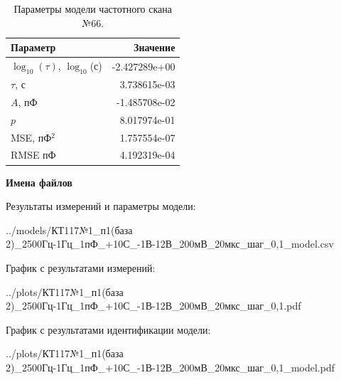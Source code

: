 \begin{table}[!ht]
    \centering
    \caption{Параметры модели частотного скана №66.}
    \begin{tabular}{|l|r|}
        \hline
        Параметр                                       & Значение                  \\ \hline
        $\log_{10}(\tau)$, $\log_{10}$(с)              & -2.427289e+00             \\ \hline
        $\tau$, с                                      & 3.738615e-03              \\ \hline
        $A$, пФ                                        & -1.485708e-02             \\ \hline
        $p$                                            & 8.017974e-01              \\ \hline
        MSE, пФ$^2$                                    & 1.757554e-07              \\ \hline
        RMSE пФ                                        & 4.192319e-04              \\ \hline
    \end{tabular}
    \label{table:frequency_scan_model_66}
\end{table}

\textbf{Имена файлов}

Результаты измерений и параметры модели:

\scriptsize../models/КТ117№1\_п1(база 2)\_2500Гц-1Гц\_1пФ\_+10С\_-1В-12В\_200мВ\_20мкс\_шаг\_0,1\_model.csv
\normalsize

График с результатами измерений:

\scriptsize../plots/КТ117№1\_п1(база 2)\_2500Гц-1Гц\_1пФ\_+10С\_-1В-12В\_200мВ\_20мкс\_шаг\_0,1.pdf
\normalsize

График с результатами идентификации модели:

\scriptsize../plots/КТ117№1\_п1(база 2)\_2500Гц-1Гц\_1пФ\_+10С\_-1В-12В\_200мВ\_20мкс\_шаг\_0,1\_model.pdf
\normalsize

